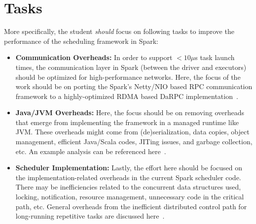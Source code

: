 \documentclass[10pt,a4paper]{article}
\begin{document}
% 
% 
% 
% 

\section*{Tasks}

More specifically, the student \textit{should} focus on following tasks to
improve the performance of the scheduling framework in Spark:

\begin{itemize}
  \item \textbf{Communication Overheads:} In order to support $<10\mu$s 
  task launch times, the communication layer in Spark (between the
  driver and executors) should be optimized for high-performance
  networks. Here, the focus of the work should be on porting the Spark's
  Netty/NIO based RPC communication framework to a highly-optimized RDMA
  based DaRPC implementation~\cite{2018-github-darpc,2014-socc-darpc}.

\item \textbf{Java/JVM Overheads:} Here, the focus should be on removing 
overheads that emerge from implementing the framework in a managed runtime
like JVM. These overheads might come from (de)serialization, data copies, 
object management, efficient Java/Scala codes, JITing issues, 
and garbage collection, etc. An example analysis can be referenced
here~\cite{2016-osdi-warmjvm}.
  
\item \textbf{Scheduler Implementation:} Lastly, the effort here should be
focused on the implementation-related overheads in the current Spark scheduler
code. There may be inefficiencies related to the concurrent 
data structures used, locking, notification, resource management, 
unnecessary code in the critical path, etc. General overheads from the 
inefficient distributed control path for long-running repetitive tasks 
are discussed here~\cite{2017-atc-nimbus}.
\end{itemize}
\end{document}
